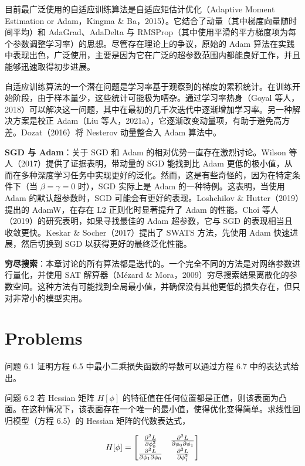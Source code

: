 目前最广泛使用的自适应训练算法是自适应矩估计优化（Adaptive Moment Estimation or Adam，Kingma \& Ba，2015）。它结合了动量（其中梯度向量随时间平均）和 AdaGrad、AdaDelta 与 RMSProp（其中使用平滑的平方梯度项为每个参数调整学习率）的思想。尽管存在理论上的争议，原始的 Adam 算法在实践中表现出色，广泛使用，主要是因为它在广泛的超参数范围内都能良好工作，并且能够迅速取得初步进展。

自适应训练算法的一个潜在问题是学习率基于观察到的梯度的累积统计。在训练开始阶段，由于样本量少，这些统计可能极为嘈杂。通过学习率热身（Goyal 等人，2018）可以解决这一问题，其中在最初的几千次迭代中逐渐增加学习率。另一种解决方案是校正 Adam（Liu 等人，2021a），它逐渐改变动量项，有助于避免高方差。Dozat（2016）将 Nesterov 动量整合入 Adam 算法中。

\textbf{SGD 与 Adam}：关于 SGD 和 Adam 的相对优势一直存在激烈讨论。Wilson 等人（2017）提供了证据表明，带动量的 SGD 能找到比 Adam 更低的极小值，从而在多种深度学习任务中实现更好的泛化。然而，这是有些奇怪的，因为在特定条件下（当 \(\beta = \gamma = 0\) 时），SGD 实际上是 Adam 的一种特例。这表明，当使用 Adam 的默认超参数时，SGD 可能会有更好的表现。Loshchilov \& Hutter（2019）提出的 AdamW，在存在 L2 正则化时显著提升了 Adam 的性能。Choi 等人（2019）的研究表明，如果寻找最佳的 Adam 超参数，它与 SGD 的表现相当且收敛更快。Keskar \& Socher（2017）提出了 SWATS 方法，先使用 Adam 快速进展，然后切换到 SGD 以获得更好的最终泛化性能。

\textbf{穷尽搜索}：本章讨论的所有算法都是迭代的。一个完全不同的方法是对网络参数进行量化，并使用 SAT 解算器（Mézard \& Mora，2009）穷尽搜索结果离散化的参数空间。这种方法有可能找到全局最小值，并确保没有其他更低的损失存在，但只对非常小的模型实用。

\section{Problems}
问题 6.1 证明方程 6.5 中最小二乘损失函数的导数可以通过方程 6.7 中的表达式给出。

问题 6.2 若 Hessian 矩阵 \(H[\phi]\) 的特征值在任何位置都是正值，则该表面为凸面。在这种情况下，该表面存在一个唯一的最小值，使得优化变得简单。求线性回归模型（方程 6.5）的 Hessian 矩阵的代数表达式，

\begin{equation}
H[\phi] = \begin{bmatrix}
\frac{\partial^2 L}{\partial \phi_0^2} & \frac{\partial^2 L}{\partial \phi_0 \partial \phi_1} \notag \\
\frac{\partial^2 L}{\partial \phi_1 \partial \phi_0} & \frac{\partial^2 L}{\partial \phi_1^2} \notag \\
\end{bmatrix} 
\end{equation}


